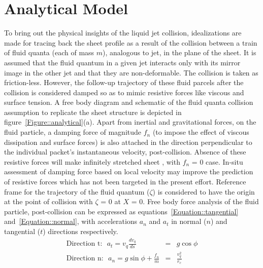 \section{Analytical Model}
To bring out the physical insights of the liquid jet collision, idealizations are made for tracing back the sheet profile as a result of the collision between a train of fluid quanta (each of mass $m$), analogous to jet, in the plane of the sheet. It is assumed that the fluid quantum in a given jet interacts only with its mirror image in the other jet and that they are non-deformable. The collision is taken as friction-less. However, the follow-up trajectory of these fluid parcels after the collision is considered damped so as to mimic resistive forces like viscous and surface tension. A free body diagram and schematic of the fluid quanta collision assumption to replicate the sheet structure is depicted in figure~\ref{Figure::analytical}(a). Apart from inertial and gravitational forces, on the fluid particle, a damping force of magnitude $f_n$ (to impose the effect of viscous dissipation and surface forces) is also attached in the direction perpendicular to the individual packet's instantaneous velocity, post-collision. Absence of these resistive forces will make infinitely stretched sheet \citep{taylor1960formation}, with $f_n$ = 0 case. In-situ assessment of damping force based on local velocity may improve the prediction of resistive forces which has not been targeted in the present effort. Reference frame for the trajectory of the fluid quantum ($\zeta$) is considered to have the origin at the point of collision with $\zeta$ = 0 at $X$ = 0. Free body force analysis of the fluid particle, post-collision can be expressed as equations~\ref{Equation::tangential} and~\ref{Equation::normal}, with accelerations $a_n$ and $a_t$ in normal ($n$) and tangential ($t$) directions respectively.
\begin{subequations}%
	\label{Equation::forceBal}	
	\begin{eqnarray}
	\label{Equation::tangential}
	\text{Direction t:}\:\:\: a_t = v_{q}\frac{dv_{q}}{ds} &=& g\cos\phi\\
	\label{Equation::normal}
	\text{Direction n:}\:\:\: a_n = g\sin\phi + \frac{f_n}{m} &=& \frac{v_{q}^2}{r_c}
	\end{eqnarray}
\end{subequations}
